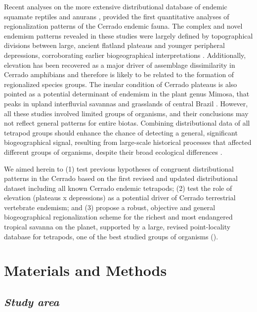 \documentclass[12pt,openright,oneside,a4paper,english]{abntex2}
\begin{document}
Recent analyses on the more extensive distributional database of endemic squamate reptiles and anurans \citep{Nogueira2011, Azevedo2016}, provided the first quantitative analyses of regionalization patterns of the Cerrado endemic fauna. The complex and novel endemism patterns revealed in these studies were largely defined by topographical divisions between large, ancient flatland plateaus and younger peripheral depressions, corroborating earlier biogeographical interpretations \citep{BrownGiff2002, Silva2002}. Additionally, elevation has been recovered as a major driver of assemblage dissimilarity in Cerrado amphibians \citep{Valdujo2013} and therefore is likely to be related to the formation of regionalized species groups. The insular condition of Cerrado plateaus is also pointed as a potential determinant of endemism in the plant genus Mimosa, that peaks in upland interfluvial savannas and grasslands of central Brazil \citep{Simon2000}. However, all these studies involved limited groups of organisms, and their conclusions may not reflect general patterns for entire biotas. Combining distributional data of all tetrapod groups should enhance the chance of detecting a general, significant biogeographical signal, resulting from large-scale historical processes that affected different groups of organisms, despite their broad ecological differences \citep{Roll2017}.

We aimed herein to (1) test previous hypotheses of congruent distributional patterns in the Cerrado based on the first revised and updated distributional dataset including all known Cerrado endemic tetrapods; (2) test the role of elevation (plateaus x depressions) as a potential driver of Cerrado terrestrial vertebrate endemism; and (3) propose a robust, objective and general biogeographical regionalization scheme for the richest and most endangered tropical savanna on the planet, supported by a large, revised point-locality database for tetrapods, one of the best studied groups of organisms (\citealp[see][]{Gaston1996, Roll2017}).

\section{Materials and Methods}
\subsection{\textit{Study area}}
\end{document}
